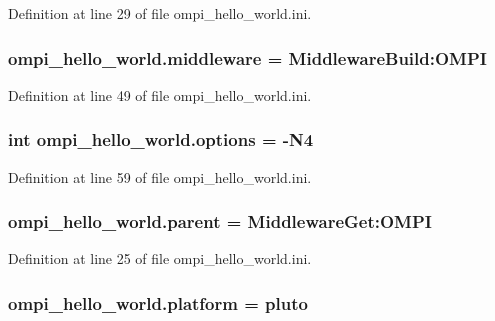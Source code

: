 Definition at line 29 of file ompi\-\_\-hello\-\_\-world.\-ini.

\hypertarget{namespaceompi__hello__world_a64807561a94c3ff5b1c9a945e580f643}{
\subsubsection[{middleware}]{\setlength{\rightskip}{0pt plus 5cm}ompi\-\_\-hello\-\_\-world.\-middleware = Middleware\-Build\-:\-O\-M\-P\-I}}\label{namespaceompi__hello__world_a64807561a94c3ff5b1c9a945e580f643}


Definition at line 49 of file ompi\-\_\-hello\-\_\-world.\-ini.

\hypertarget{namespaceompi__hello__world_a4bc86d53822edfbcb8b35e8fc40d0075}{
\subsubsection[{options}]{\setlength{\rightskip}{0pt plus 5cm}int ompi\-\_\-hello\-\_\-world.\-options = -\/N4}}\label{namespaceompi__hello__world_a4bc86d53822edfbcb8b35e8fc40d0075}


Definition at line 59 of file ompi\-\_\-hello\-\_\-world.\-ini.

\hypertarget{namespaceompi__hello__world_a5508612e06f3402554fdda7a9eca7d62}{
\subsubsection[{parent}]{\setlength{\rightskip}{0pt plus 5cm}ompi\-\_\-hello\-\_\-world.\-parent = Middleware\-Get\-:\-O\-M\-P\-I}}\label{namespaceompi__hello__world_a5508612e06f3402554fdda7a9eca7d62}


Definition at line 25 of file ompi\-\_\-hello\-\_\-world.\-ini.

\hypertarget{namespaceompi__hello__world_af8ab2503d0ec334a65a72e930a24e713}{
\subsubsection[{platform}]{\setlength{\rightskip}{0pt plus 5cm}ompi\-\_\-hello\-\_\-world.\-platform = pluto}}\label{namespaceompi__hello__world_af8ab2503d0ec334a65a72e930a24e713}


